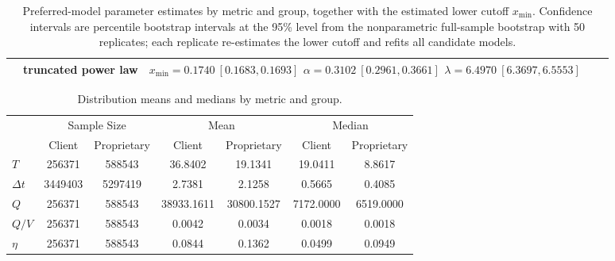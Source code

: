 \documentclass[11pt]{article}
\begin{document}
\begin{table}[htbp]
{\begin{tabular}{lclcl}
& truncated power law
& \shortstack[l]{$x_{\min}=0.1740\ [0.1683, 0.1693]$\\$\alpha=0.3102\ [0.2961, 0.3661]$\\$\lambda=6.4970\ [6.3697, 6.5553]$} \\
\bottomrule
\end{tabular}%
}
\caption{Preferred-model parameter estimates by metric and group, together with the estimated lower cutoff $x_{\min}$.
Confidence intervals are percentile bootstrap intervals at the 95\% level from the nonparametric full-sample
bootstrap with 50 replicates; each replicate re-estimates the lower cutoff and refits all candidate models.}
\label{tab:bootstrap-fit-parameters}
\end{table}


\begin{table}[htbp]
\centering
\scriptsize
\renewcommand{\arraystretch}{1.15}
\setlength{\tabcolsep}{4pt}

\begin{tabular}{lcccccc}
\toprule
& \multicolumn{2}{c}{Sample Size}
& \multicolumn{2}{c}{Mean}
& \multicolumn{2}{c}{Median} \\
\cmidrule(lr){2-3}
\cmidrule(lr){4-5}
\cmidrule(lr){6-7}
& Client & Proprietary
& Client & Proprietary
& Client & Proprietary \\
\midrule

$T$
& 256371 & 588543
& 36.8402 & 19.1341
& 19.0411 & 8.8617 \\

$\Delta t$
& 3449403 & 5297419
& 2.7381 & 2.1258
& 0.5665 & 0.4085 \\

$Q$
& 256371 & 588543
& 38933.1611 & 30800.1527
& 7172.0000 & 6519.0000 \\

$Q/V$
& 256371 & 588543
& 0.0042 & 0.0034
& 0.0018 & 0.0018 \\

$\eta$
& 256371 & 588543
& 0.0844 & 0.1362
& 0.0499 & 0.0949 \\
\bottomrule
\end{tabular}%

\caption{Distribution means and medians by metric and group.}
\label{tab:distribution-means-medians}
\end{table}
\end{document}
